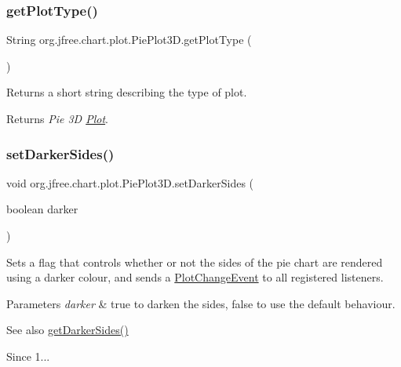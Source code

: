 \subsubsection{\texorpdfstring{get\+Plot\+Type()}{getPlotType()}}
{\footnotesize\ttfamily String org.\+jfree.\+chart.\+plot.\+Pie\+Plot3\+D.\+get\+Plot\+Type (\begin{DoxyParamCaption}{ }\end{DoxyParamCaption})}

Returns a short string describing the type of plot.

\begin{DoxyReturn}{Returns}
{\itshape Pie 3D \mbox{\hyperlink{classorg_1_1jfree_1_1chart_1_1plot_1_1_plot}{Plot}}}. 
\end{DoxyReturn}
\mbox{\label{classorg_1_1jfree_1_1chart_1_1plot_1_1_pie_plot3_d_ad880cf39b21e7aee0c5a6f0d97859e4a}} 
\subsubsection{\texorpdfstring{set\+Darker\+Sides()}{setDarkerSides()}}
{\footnotesize\ttfamily void org.\+jfree.\+chart.\+plot.\+Pie\+Plot3\+D.\+set\+Darker\+Sides (\begin{DoxyParamCaption}\item[{boolean}]{darker }\end{DoxyParamCaption})}

Sets a flag that controls whether or not the sides of the pie chart are rendered using a darker colour, and sends a \mbox{\hyperlink{}{Plot\+Change\+Event}} to all registered listeners.


\begin{DoxyParams}{Parameters}
{\em darker} & true to darken the sides, false to use the default behaviour.\\
\hline
\end{DoxyParams}
\begin{DoxySeeAlso}{See also}
\mbox{\hyperlink{classorg_1_1jfree_1_1chart_1_1plot_1_1_pie_plot3_d_a3a06898f05f1e6737aa01f781d80a50e}{get\+Darker\+Sides()}}
\end{DoxySeeAlso}
\begin{DoxySince}{Since}
1... 
\end{DoxySince}
\mbox{\label{classorg_1_1jfree_1_1chart_1_1plot_1_1_pie_plot3_d_a8b4759289ed982cd7d456b44b90f6b13}} 
